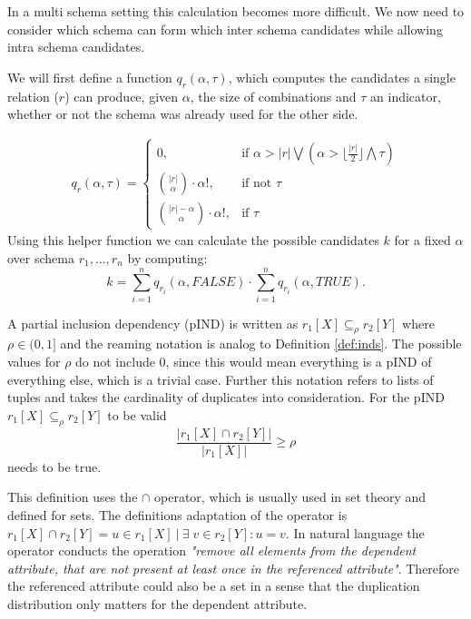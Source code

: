 \noindent In a multi schema setting this calculation becomes more difficult. We now need to consider which schema can form which inter schema candidates while allowing intra schema candidates.
\begin{definition}\label{def:candidates-MS}
    We will first define a function $q_r(\alpha, \tau)$, which computes the candidates a single relation ($r$) can produce, given $\alpha$, the size of combinations and $\tau$ an indicator, whether or not the schema was already used for the other side.

    \begin{align*}
        q_r(\alpha, \tau) = \begin{cases}
            0, & \text{if } \alpha > |r| \bigvee (\alpha > \lfloor\frac{|r|}{2}\rfloor \bigwedge \tau)\\
            \binom{|r|}{\alpha}\cdot \alpha!, & \text{if not } \tau \\
            \binom{|r| - \alpha}{\alpha}\cdot \alpha!, & \text{if } \tau
        \end{cases}
    \end{align*}
    Using this helper function we can calculate the possible candidates $k$ for a fixed $\alpha$ over schema $r_1, \dots, r_n$ by computing:
    $$
        k = \sum\limits_{i = 1}^n q_{r_i}(\alpha, FALSE) \cdot \sum\limits_{i = 1}^n q_{r_i}(\alpha, TRUE).
    $$
\end{definition}

\begin{definition}\label{def:pinds}
    A partial inclusion dependency (pIND) is written as $r_1[X] \subseteq_{\rho} r_2[Y]$ where $\rho \in (0, 1]$ and the reaming notation is analog to Definition \ref{def:inds}. The possible values for $\rho$ do not include $0$, since this would mean everything is a pIND of everything else, which is a trivial case. Further this notation refers to lists of tuples and takes the cardinality of duplicates into consideration. For the pIND $r_1[X] \subseteq_{\rho} r_2[Y]$ to be valid
    $$
        \frac{|r_1[X] \cap r_2[Y]|}
            {|r_1[X]|} \geq \rho
    $$
    needs to be true.
\end{definition}

\noindent 
This definition uses the $\cap$ operator, which is usually used in set theory and defined for sets. 
The definitions adaptation of the operator is $r_1[X] \cap r_2[Y] = u \in r_1[X] \: | \: \exists \; v \in r_2[Y] : u = v$.
In natural language the operator conducts the operation \textit{"remove all elements from the dependent attribute, that are not present at least once in the referenced attribute"}. Therefore the referenced attribute could also be a set in a sense that the duplication distribution only matters for the dependent attribute.\\

